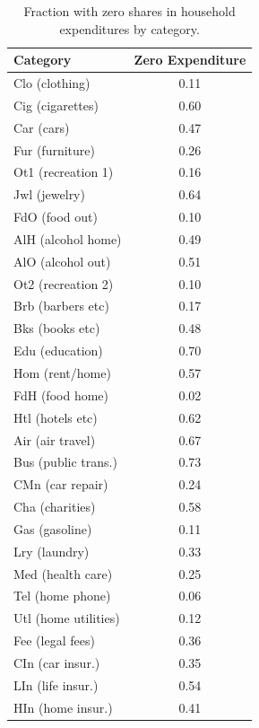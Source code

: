\documentclass{article}
\begin{document}
\begin{table}
	\begin{center}
\begin{tabular}{|l|c|}
	\hline
\textbf{Category} & \textbf{Zero Expenditure} \\
	\hline
Clo (clothing) & 0.11 \\ 
	\hline
Cig (cigarettes) & 0.60 \\ 
	\hline
Car (cars) & 0.47 \\ 
	\hline
Fur (furniture) & 0.26 \\ 
	\hline
Ot1 (recreation 1) & 0.16 \\ 
	\hline
Jwl (jewelry) & 0.64 \\ 
	\hline
FdO (food out) & 0.10 \\ 
	\hline
AlH (alcohol home) & 0.49 \\ 
	\hline
AlO (alcohol out) & 0.51 \\ 
	\hline
Ot2 (recreation 2) & 0.10 \\ 
	\hline
Brb (barbers etc) & 0.17 \\ 
	\hline
Bks (books etc) & 0.48 \\ 
	\hline
Edu (education) & 0.70 \\ 
	\hline
Hom (rent/home) & 0.57 \\ 
	\hline
FdH (food home) & 0.02 \\ 
	\hline
Htl (hotels etc) & 0.62 \\ 
	\hline
Air (air travel) & 0.67 \\ 
	\hline
Bus (public trans.) & 0.73 \\ 
	\hline
CMn (car repair) & 0.24 \\ 
	\hline
Cha (charities) & 0.58 \\ 
	\hline
Gas (gasoline) & 0.11 \\ 
	\hline
Lry (laundry) & 0.33 \\ 
	\hline
Med (health care) & 0.25 \\ 
	\hline
Tel (home phone) & 0.06 \\ 
	\hline
Utl (home utilities) & 0.12 \\ 
	\hline
Fee (legal fees) & 0.36 \\ 
	\hline
CIn (car insur.) & 0.35 \\ 
	\hline
LIn (life insur.) & 0.54 \\ 
	\hline
HIn (home insur.) & 0.41 \\ 
	\hline
\end{tabular}
\end{center}
\label{tab:sharetab}
\caption{Fraction with zero shares in household expenditures by category.}
\vspace{-2in}
\end{table}
\end{document}
